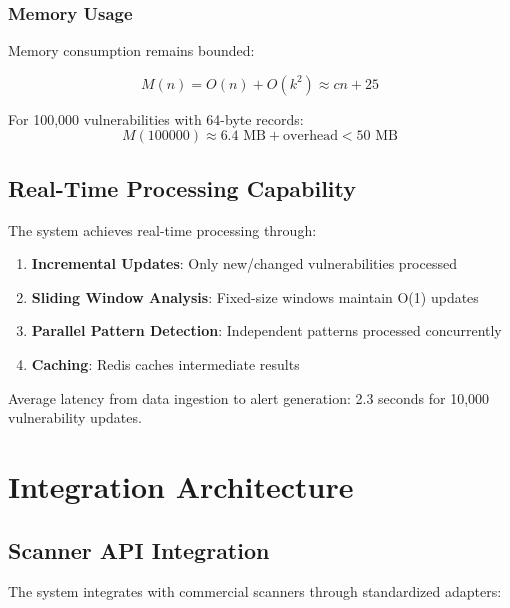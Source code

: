 \documentclass[11pt,a4paper]{article}
\begin{document}
\subsubsection{Memory Usage}

Memory consumption remains bounded:

\begin{equation}
M(n) = O(n) + O(k^2) \approx cn + 25
\end{equation}

For 100,000 vulnerabilities with 64-byte records:
\begin{equation}
M(100000) \approx 6.4 \text{ MB} + \text{overhead} < 50 \text{ MB}
\end{equation}

\subsection{Real-Time Processing Capability}

The system achieves real-time processing through:

\begin{enumerate}
\item \textbf{Incremental Updates}: Only new/changed vulnerabilities processed
\item \textbf{Sliding Window Analysis}: Fixed-size windows maintain O(1) updates
\item \textbf{Parallel Pattern Detection}: Independent patterns processed concurrently
\item \textbf{Caching}: Redis caches intermediate results
\end{enumerate}

Average latency from data ingestion to alert generation: 2.3 seconds for 10,000 vulnerability updates.

\section{Integration Architecture}

\subsection{Scanner API Integration}

The system integrates with commercial scanners through standardized adapters:
\end{document}
